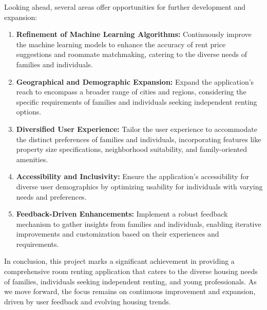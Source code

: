 Looking ahead, several areas offer opportunities for further development and expansion:
\begin{enumerate}
    \item \textbf{Refinement of Machine Learning Algorithms:} Continuously improve the machine learning models to enhance the accuracy of rent price suggestions and roommate matchmaking, catering to the diverse needs of families and individuals.

    \item \textbf{Geographical and Demographic Expansion:} Expand the application's reach to encompass a broader range of cities and regions, considering the specific requirements of families and individuals seeking independent renting options.

    \item \textbf{Diversified User Experience:} Tailor the user experience to accommodate the distinct preferences of families and individuals, incorporating features like property size specifications, neighborhood suitability, and family-oriented amenities.

    \item \textbf{Accessibility and Inclusivity:} Ensure the application's accessibility for diverse user demographics by optimizing usability for individuals with varying needs and preferences.

    \item \textbf{Feedback-Driven Enhancements:} Implement a robust feedback mechanism to gather insights from families and individuals, enabling iterative improvements and customization based on their experiences and requirements.
\end{enumerate}
\bigskip
In conclusion, this project marks a significant achievement in providing a comprehensive room renting application that caters to the diverse housing needs of families, individuals seeking independent renting, and young professionals. As we move forward, the focus remains on continuous improvement and expansion, driven by user feedback and evolving housing trends.

